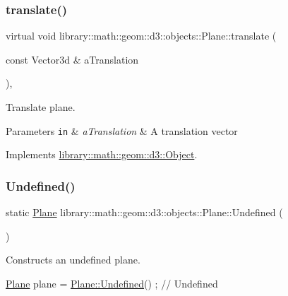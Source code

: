 \subsubsection{\texorpdfstring{translate()}{translate()}}
{\footnotesize\ttfamily virtual void library\+::math\+::geom\+::d3\+::objects\+::\+Plane\+::translate (\begin{DoxyParamCaption}\item[{const Vector3d \&}]{a\+Translation }\end{DoxyParamCaption})\hspace{0.3cm}{\ttfamily [override]}, {\ttfamily [virtual]}}



Translate plane. 


\begin{DoxyParams}[1]{Parameters}
\mbox{\tt in}  & {\em a\+Translation} & A translation vector \\
\hline
\end{DoxyParams}


Implements \hyperlink{classlibrary_1_1math_1_1geom_1_1d3_1_1_object_a989723a27a7d5f6739e45ea695a6c7ed}{library\+::math\+::geom\+::d3\+::\+Object}.

\mbox{\label{classlibrary_1_1math_1_1geom_1_1d3_1_1objects_1_1_plane_a27a635007aaccdc55f2c5c12a8264c20}} 
\subsubsection{\texorpdfstring{Undefined()}{Undefined()}}
{\footnotesize\ttfamily static \hyperlink{classlibrary_1_1math_1_1geom_1_1d3_1_1objects_1_1_plane}{Plane} library\+::math\+::geom\+::d3\+::objects\+::\+Plane\+::\+Undefined (\begin{DoxyParamCaption}{ }\end{DoxyParamCaption})\hspace{0.3cm}{\ttfamily [static]}}



Constructs an undefined plane. 


\begin{DoxyCode}
\hyperlink{classlibrary_1_1math_1_1geom_1_1d3_1_1objects_1_1_plane_a81fe78a983e2cb6ee6ad9bfabd22c3a4}{Plane} plane = \hyperlink{classlibrary_1_1math_1_1geom_1_1d3_1_1objects_1_1_plane_a27a635007aaccdc55f2c5c12a8264c20}{Plane::Undefined}() ; \textcolor{comment}{// Undefined}
\end{DoxyCode}


